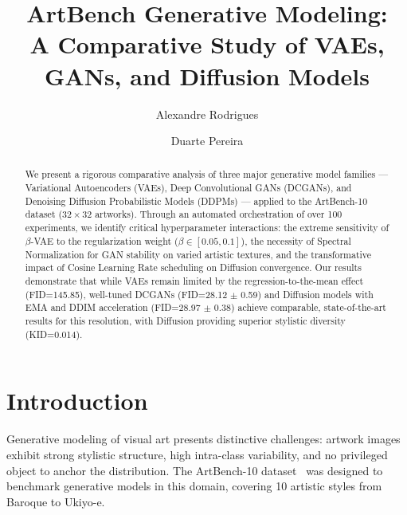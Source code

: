 \documentclass[runningheads]{llncs}
\begin{document}
\title{ArtBench Generative Modeling:\texorpdfstring{\\}{ }A Comparative Study of VAEs, GANs, and Diffusion Models}

\author{Alexandre Rodrigues \and
Duarte Pereira}



\maketitle

\begin{abstract}
We present a rigorous comparative analysis of three major generative model families --- Variational Autoencoders (VAEs), Deep Convolutional GANs (DCGANs), and Denoising Diffusion Probabilistic Models (DDPMs) --- applied to the ArtBench-10 dataset ($32\times 32$ artworks). Through an automated orchestration of over 100 experiments, we identify critical hyperparameter interactions: the extreme sensitivity of $\beta$-VAE to the regularization weight ($\beta \in [0.05, 0.1]$), the necessity of Spectral Normalization for GAN stability on varied artistic textures, and the transformative impact of Cosine Learning Rate scheduling on Diffusion convergence. Our results demonstrate that while VAEs remain limited by the regression-to-the-mean effect (FID=145.85), well-tuned DCGANs (FID=28.12 $\pm$ 0.59) and Diffusion models with EMA and DDIM acceleration (FID=28.97 $\pm$ 0.38) achieve comparable, state-of-the-art results for this resolution, with Diffusion providing superior stylistic diversity (KID=0.014).
\end{abstract}

\section{Introduction}\label{sec:intro}

Generative modeling of visual art presents distinctive challenges: artwork images exhibit strong stylistic structure, high intra-class variability, and no privileged object to anchor the distribution. The ArtBench-10 dataset~\cite{liao2022} was designed to benchmark generative models in this domain, covering 10 artistic styles from Baroque to Ukiyo-e.
\end{document}
